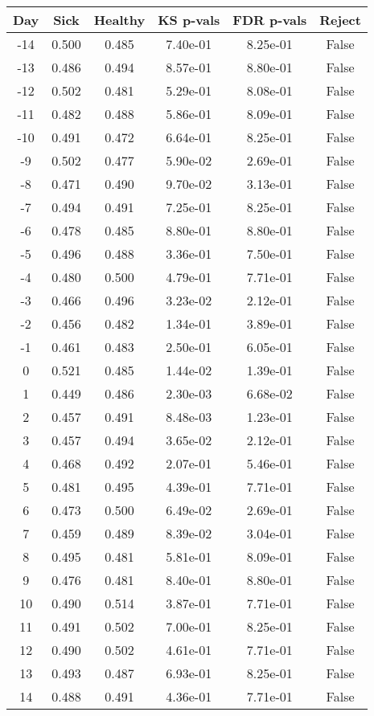 \begin{tabular}{c|c|c|c|c|c}
Day &  Sick & Healthy &  KS p-vals & FDR p-vals & Reject\\
\hline
-14 & 0.500 &   0.485 &   7.40e-01 &   8.25e-01 &  False\\
-13 & 0.486 &   0.494 &   8.57e-01 &   8.80e-01 &  False\\
-12 & 0.502 &   0.481 &   5.29e-01 &   8.08e-01 &  False\\
-11 & 0.482 &   0.488 &   5.86e-01 &   8.09e-01 &  False\\
-10 & 0.491 &   0.472 &   6.64e-01 &   8.25e-01 &  False\\
 -9 & 0.502 &   0.477 &   5.90e-02 &   2.69e-01 &  False\\
 -8 & 0.471 &   0.490 &   9.70e-02 &   3.13e-01 &  False\\
 -7 & 0.494 &   0.491 &   7.25e-01 &   8.25e-01 &  False\\
 -6 & 0.478 &   0.485 &   8.80e-01 &   8.80e-01 &  False\\
 -5 & 0.496 &   0.488 &   3.36e-01 &   7.50e-01 &  False\\
 -4 & 0.480 &   0.500 &   4.79e-01 &   7.71e-01 &  False\\
 -3 & 0.466 &   0.496 &   3.23e-02 &   2.12e-01 &  False\\
 -2 & 0.456 &   0.482 &   1.34e-01 &   3.89e-01 &  False\\
 -1 & 0.461 &   0.483 &   2.50e-01 &   6.05e-01 &  False\\
  0 & 0.521 &   0.485 &   1.44e-02 &   1.39e-01 &  False\\
  1 & 0.449 &   0.486 &   2.30e-03 &   6.68e-02 &  False\\
  2 & 0.457 &   0.491 &   8.48e-03 &   1.23e-01 &  False\\
  3 & 0.457 &   0.494 &   3.65e-02 &   2.12e-01 &  False\\
  4 & 0.468 &   0.492 &   2.07e-01 &   5.46e-01 &  False\\
  5 & 0.481 &   0.495 &   4.39e-01 &   7.71e-01 &  False\\
  6 & 0.473 &   0.500 &   6.49e-02 &   2.69e-01 &  False\\
  7 & 0.459 &   0.489 &   8.39e-02 &   3.04e-01 &  False\\
  8 & 0.495 &   0.481 &   5.81e-01 &   8.09e-01 &  False\\
  9 & 0.476 &   0.481 &   8.40e-01 &   8.80e-01 &  False\\
 10 & 0.490 &   0.514 &   3.87e-01 &   7.71e-01 &  False\\
 11 & 0.491 &   0.502 &   7.00e-01 &   8.25e-01 &  False\\
 12 & 0.490 &   0.502 &   4.61e-01 &   7.71e-01 &  False\\
 13 & 0.493 &   0.487 &   6.93e-01 &   8.25e-01 &  False\\
 14 & 0.488 &   0.491 &   4.36e-01 &   7.71e-01 &  False\\
\end{tabular}